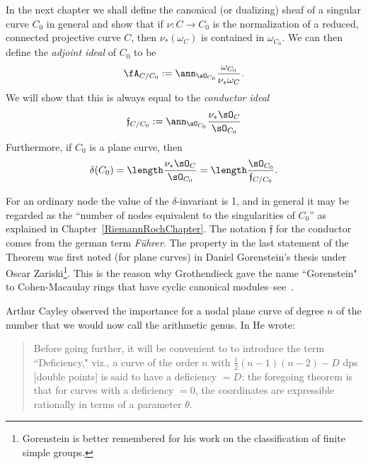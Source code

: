 In the next chapter we shall define the canonical (or dualizing) sheaf of a singular curve $C_0$ in 
general and show that if $\nu: C\to C_0$ is the normalization of a reduced, connected
projective curve $C$, then $\nu_*(\omega_C)$ is contained in $\omega_{C_0}$. We can
then define the \emph{adjoint ideal} of $C_0$ to be 
$$
\fA_{C/C_0} :=\ann_{\sO_{C_0}}\frac{\omega_{C_0}}{\nu_* \omega_C}.
$$
We will show that this is always equal to the \emph{conductor ideal}
$$
\mathfrak f_{C/C_0}: = \ann_{\sO_{C_0}}\frac{\nu_* \sO_C}{\sO_{C_0}}	
$$
Furthermore, if $C_0$ is a plane curve, then 
$$
\delta(C_0) = \length \frac{\nu_* \sO_C}{\sO_{C_0}} = \length \frac {\sO_{C_0}}{\mathfrak f_{C/C_0}}.
$$

For an ordinary node the value of the $\delta$-invariant is 1, and in general it may be regarded as the ``number of nodes equivalent to the singularities of $C_0$'' as
explained in Chapter~\ref{RiemannRochChapter}. The notation $\mathfrak f$ for the conductor comes from the german term \emph{F\"uhrer}. The property in the last statement of the
Theorem  was first noted (for plane curves) in Daniel Gorenstein's thesis under Oscar Zariski\footnote{Gorenstein is better remembered for his work on the classification of finite simple groups.}. This is the
reason why Grothendieck gave the name ``Gorenstein" to Cohen-Macaulay rings that have cyclic canonical 
modules--see~\cite{Bass}. 
%
%
%
%

Arthur Cayley observed the importance for a nodal plane curve of degree $n$ of the number
that we would now call the arithmetic genus. In \cite{Cayley2} He wrote:
\begin{quotation}
 Before going further, it will be convenient to to introduce the term ``Deficiency," viz., a curve of the order $n$ with
 $\frac{1}{2}(n-1)(n-2)-D$ dps [double points] is said to have a deficiency $=D$: the foregoing theorem is that for curves with a deficiency $=0$, the coordinates are expressible rationally in terms of a parameter $\theta$.
  \end{quotation}
 
